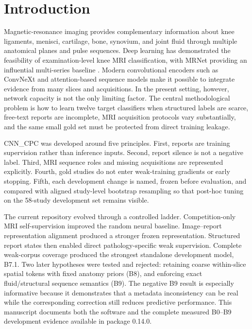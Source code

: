 \documentclass[preprint,12pt]{elsarticle}
\begin{document}
\section{Introduction}
\label{sec:introduction}

Magnetic-resonance imaging provides complementary information about knee ligaments, menisci, cartilage, bone, synovium, and joint fluid through multiple anatomical planes and pulse sequences. Deep learning has demonstrated the feasibility of examination-level knee MRI classification, with MRNet providing an influential multi-series baseline \cite{bien2018mrnet}. Modern convolutional encoders such as ConvNeXt \cite{liu2022convnext} and attention-based sequence models \cite{vaswani2017attention} make it possible to integrate evidence from many slices and acquisitions. In the present setting, however, network capacity is not the only limiting factor. The central methodological problem is how to learn twelve target classifiers when structured labels are scarce, free-text reports are incomplete, MRI acquisition protocols vary substantially, and the same small gold set must be protected from direct training leakage.

CNN\_CPC was developed around five principles. First, reports are training supervision rather than inference inputs. Second, report silence is not a negative label. Third, MRI sequence roles and missing acquisitions are represented explicitly. Fourth, gold studies do not enter weak-training gradients or early stopping. Fifth, each development change is named, frozen before evaluation, and compared with aligned study-level bootstrap resampling so that post-hoc tuning on the 58-study development set remains visible.

The current repository evolved through a controlled ladder. Competition-only MRI self-supervision improved the random neural baseline. Image--report representation alignment produced a stronger frozen representation. Structured report states then enabled direct pathology-specific weak supervision. Complete weak-corpus coverage produced the strongest standalone development model, B7.1. Two later hypotheses were tested and rejected: retaining coarse within-slice spatial tokens with fixed anatomy priors (B8), and enforcing exact fluid/structural sequence semantics (B9). The negative B9 result is especially informative because it demonstrates that a metadata inconsistency can be real while the corresponding correction still reduces predictive performance. This manuscript documents both the software and the complete measured B0--B9 development evidence available in package 0.14.0.
\end{document}
